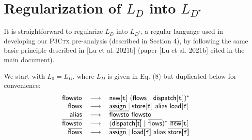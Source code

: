 \documentclass[sigplan,10pt,review,anonymous]{acmart}
\newcommand{\tool}{\textsc{P3Ctx}\xspace}
\newcommand{\reg}[1]{\textsf{#1}\xspace}
\newcommand{\invreg}[1]{\overline{\reg{#1}}\xspace}
\newcommand{\flowsto}{\reg{flowsto}}
\newcommand{\iflowsto}{\invreg{flowsto}}
\newcommand{\alias}{\reg{alias}}
\newcommand{\flows}{\reg{flows}}
\newcommand{\iflows}{\invreg{flows}}
\newcommand{\new}{\reg{new}}
\newcommand{\inew}{\invreg{new}}
\newcommand{\assign}{\reg{assign}}
\newcommand{\iassign}{\invreg{assign}}
\newcommand{\store}{\reg{store}}
\newcommand{\load}{\reg{load}}
\newcommand{\iloadfield}[1]{\invreg{load[#1]}}
\newcommand{\istorefield}[1]{\invreg{store[#1]}}
\newcommand{\LF}{\mbox{$L_D$}\xspace}
\newcommand{\LG}{\mbox{$L_{D^r}$}\xspace}
\newcommand{\indispatch}{\reg{dispatch}}
\newcommand{\iindispatchfield}[1]{\invreg{dispatch[#1]}}
\begin{document}


\appendix
\section{Regularization of \texorpdfstring{\LF}{} into \texorpdfstring{\LG}{}}
\label{sec:regulartization}

It is straightforward to regularize \LF into \LG, a regular language used in
developing our \tool pre-analysis (described in Section 4), by following
the same basic principle  described in [Lu et al. 2021b] (paper [Lu et al. 2021b] cited in the main document).

We start with $L_0=\LF$, where $\LF$ is given in
Eq. (8) but duplicated below for convenience:
\begin{equation}
\label{eqn:newL0}
\begin{tabular}{rcl}
$\flowsto$ & $\longrightarrow$ & $\new[\texttt{t}]~(\flows~|~\indispatch[\texttt{t}])^*$ \\
$\flows$ & $\longrightarrow$ & $\assign \mid \store[\texttt{f}] \ \alias \ \load[\texttt{f}]$\\ %
$\alias$ & $\longrightarrow$ & $\iflowsto ~ \flowsto$ \\
$\iflowsto$ & $\longrightarrow$ & $(\iindispatchfield{t}~|~\iflows)^*~\inew[\texttt{t}]$ \\
$\iflows$ & $\longrightarrow$ & $\iassign \mid \iloadfield{\texttt{f}} \ \alias \ \istorefield{\texttt{f}}$ \\ %
\end{tabular}
\end{equation}
\end{document}
